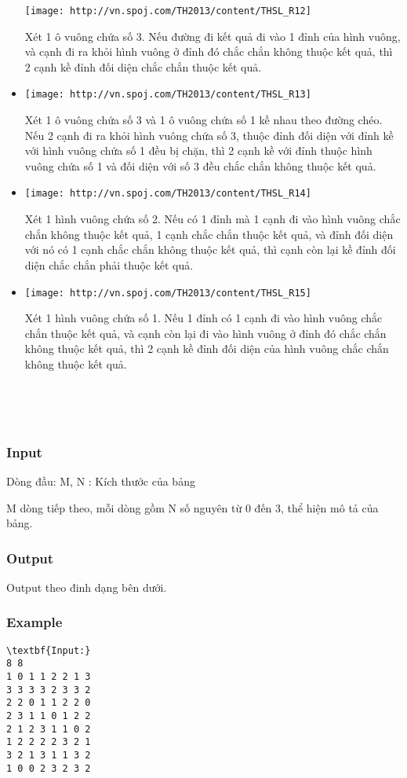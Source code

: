 \begin{itemize}
\texttt{[image: http://vn.spoj.com/TH2013/content/THSL\_R12]} 

Xét 1 ô vuông chứa số 3. Nếu đường đi kết quả đi vào 1 đỉnh của hình vuông, và cạnh đi ra khỏi hình vuông ở đỉnh đó chắc chắn không thuộc kết quả, thì 2 cạnh kề đỉnh đối diện chắc chắn thuộc kết quả.
	\item 


\texttt{[image: http://vn.spoj.com/TH2013/content/THSL\_R13]} 

Xét 1 ô vuông chứa số 3 và 1 ô vuông chứa số 1 kề nhau theo đường chéo. Nếu 2 cạnh đi ra khỏi hình vuông chứa số 3, thuộc đỉnh đối diện với đỉnh kề với hình vuông chứa số 1 đều bị chặn, thì 2 cạnh kề với đỉnh thuộc hình vuông chứa số 1 và đối diện với số 3 đều chắc chắn không thuộc kết quả.
	\item 


\texttt{[image: http://vn.spoj.com/TH2013/content/THSL\_R14]} 

Xét 1 hình vuông chứa số 2. Nếu có 1 đỉnh mà 1 cạnh đi vào hình vuông chắc chắn không thuộc kết quả, 1 cạnh chắc chắn thuộc kết quả, và đỉnh đối diện với nó có 1 cạnh chắc chắn không thuộc kết quả, thì cạnh còn lại kề đỉnh đối diện chắc chắn phải thuộc kết quả.
	\item 


\texttt{[image: http://vn.spoj.com/TH2013/content/THSL\_R15]} 

Xét 1 hình vuông chứa số 1. Nếu 1 đỉnh có 1 cạnh đi vào hình vuông chắc chắn thuộc kết quả, và cạnh còn lại đi vào hình vuông ở đỉnh đó chắc chắn không thuộc kết quả, thì 2 cạnh kề đỉnh đối diện của hình vuông chắc chắn không thuộc kết quả.


 
\end{itemize}

 

\subsubsection{Input}

Dòng đầu: M, N : Kích thước của bảng

M dòng tiếp theo, mỗi dòng gồm N số nguyên từ 0 đến 3, thể hiện mô tả của bảng.

\subsubsection{Output}

Output theo đinh dạng bên dưới.

\subsubsection{Example}
\begin{verbatim}
\textbf{Input:}
8 8
1 0 1 1 2 2 1 3
3 3 3 3 2 3 3 2
2 2 0 1 1 2 2 0
2 3 1 1 0 1 2 2
2 1 2 3 1 1 0 2
1 2 2 2 2 3 2 1
3 2 1 3 1 1 3 2
1 0 0 2 3 2 3 2\end{verbatim}

